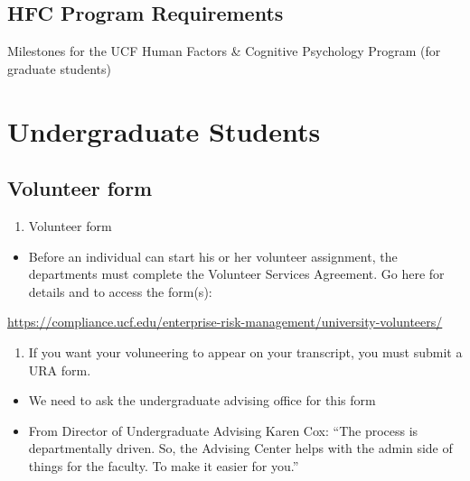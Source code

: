\documentclass[
]{book}
\providecommand{\tightlist}{%
  \setlength{\itemsep}{0pt}\setlength{\parskip}{0pt}}
\begin{document}
\hypertarget{hfc-program-requirements}{%
\subsection{HFC Program Requirements}\label{hfc-program-requirements}}

Milestones for the UCF Human Factors \& Cognitive Psychology Program (for graduate students)

\hypertarget{undergraduate-students}{%
\section{Undergraduate Students}\label{undergraduate-students}}

\hypertarget{volunteer-form}{%
\subsection{Volunteer form}\label{volunteer-form}}

\begin{enumerate}
\def\labelenumi{\arabic{enumi}.}
\tightlist
\item
  Volunteer form
\end{enumerate}

\begin{itemize}
\tightlist
\item
  Before an individual can start his or her volunteer assignment, the departments must complete the Volunteer Services Agreement. Go here for details and to access the form(s):
\end{itemize}

\url{https://compliance.ucf.edu/enterprise-risk-management/university-volunteers/}

\begin{enumerate}
\def\labelenumi{\arabic{enumi}.}
\setcounter{enumi}{1}
\tightlist
\item
  If you want your voluneering to appear on your transcript, you must submit a URA form.
\end{enumerate}

\begin{itemize}
\tightlist
\item
  We need to ask the undergraduate advising office for this form
\item
  From Director of Undergraduate Advising Karen Cox: ``The process is departmentally driven. So, the Advising Center helps with the admin side of things for the faculty. To make it easier for you.''
\end{itemize}
\end{document}
